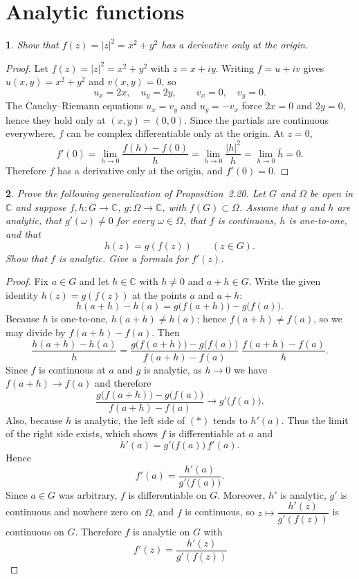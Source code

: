 \documentclass[12pt, a4paper]{report}
\theoremstyle{spaced}
\newtheorem{exercise}{}
\newcommand{\setexercise}[1]{\setcounter{exercise}{#1-1}}
\begin{document}
\section{Analytic functions}

\setexercise{1}
\begin{exercise}
	Show that \( f(z)=|z|^{2}=x^{2}+y^{2} \) has a derivative only at the origin.
\end{exercise}

\begin{proof}
	Let \(f(z)=|z|^{2}=x^{2}+y^{2}\) with \(z=x+iy\). Writing \(f=u+iv\) gives
	\(u(x,y)=x^{2}+y^{2}\) and \(v(x,y)=0\), so
	\[
		u_x=2x,\quad u_y=2y,\qquad v_x=0,\quad v_y=0.
	\]
	The Cauchy–Riemann equations \(u_x=v_y\) and \(u_y=-v_x\) force \(2x=0\) and \(2y=0\),
	hence they hold only at \((x,y)=(0,0)\). Since the partials are continuous everywhere,
	\(f\) can be complex differentiable only at the origin.
	At \(z=0\),
	\[
		f'(0)=\lim_{h\to 0}\frac{f(h)-f(0)}{h}
		=\lim_{h\to 0}\frac{|h|^{2}}{h}
		=\lim_{h\to 0}\overline{h}=0.
	\]
	Therefore \(f\) has a derivative only at the origin, and \(f'(0)=0\). \qedhere
\end{proof}


\setexercise{10}
\begin{exercise}
	Prove the following generalization of Proposition~2.20. Let \(G\) and \(\Omega\) be open in \(\mathbb{C}\) and suppose \(f,h: G\to\mathbb{C}\), \(g:\Omega\to\mathbb{C}\), with \(f(G)\subset\Omega\). Assume that \(g\) and \(h\) are analytic, that \(g'(\omega)\neq 0\) for every \(\omega\in\Omega\), that \(f\) is continuous, \(h\) is one-to-one, and that
	\[
		h(z)=g(f(z))\qquad(z\in G).
	\]
	Show that \(f\) is analytic. Give a formula for \(f'(z)\).
\end{exercise}


\begin{proof}
	Fix \(a\in G\) and let \(h\in\mathbb{C}\) with \(h\neq0\) and \(a+h\in G\).
	Write the given identity \(h(z)=g(f(z))\) at the points \(a\) and \(a+h\):
	\[
		h(a+h)-h(a)=g\big(f(a+h)\big)-g\big(f(a)\big).
	\]
	Because \(h\) is one-to-one, \(h(a+h)\neq h(a)\); hence \(f(a+h)\neq f(a)\), so we may divide by
	\(f(a+h)-f(a)\). Then
	\[
		\frac{h(a+h)-h(a)}{h}
		=\frac{g\big(f(a+h)\big)-g\big(f(a)\big)}{\,f(a+h)-f(a)\,}\;
		\frac{f(a+h)-f(a)}{h}.
		\tag{*}
	\]
	Since \(f\) is continuous at \(a\) and \(g\) is analytic, as \(h\to0\) we have
	\(f(a+h)\to f(a)\) and therefore
	\[
		\frac{g\big(f(a+h)\big)-g\big(f(a)\big)}{\,f(a+h)-f(a)\,}\longrightarrow g'\!\big(f(a)\big).
	\]
	Also, because \(h\) is analytic, the left side of \((*)\) tends to \(h'(a)\).
	Thus the limit of the right side exists, which shows \(f\) is differentiable at \(a\) and
	\[
		h'(a)=g'\!\big(f(a)\big)\,f'(a).
	\]
	Hence
	\[
		f'(a)=\frac{h'(a)}{g'\!\big(f(a)\big)}.
	\]
	Since \(a\in G\) was arbitrary, \(f\) is differentiable on \(G\). Moreover,
	\(h'\) is analytic, \(g'\) is continuous and nowhere zero on \(\Omega\), and \(f\) is continuous, so
	\(z\mapsto \dfrac{h'(z)}{g'(f(z))}\) is continuous on \(G\).
	Therefore \(f\) is analytic on \(G\) with
	\[
		\,f'(z)=\dfrac{h'(z)}{g'(f(z))}
	\]
\end{proof}
\end{document}
